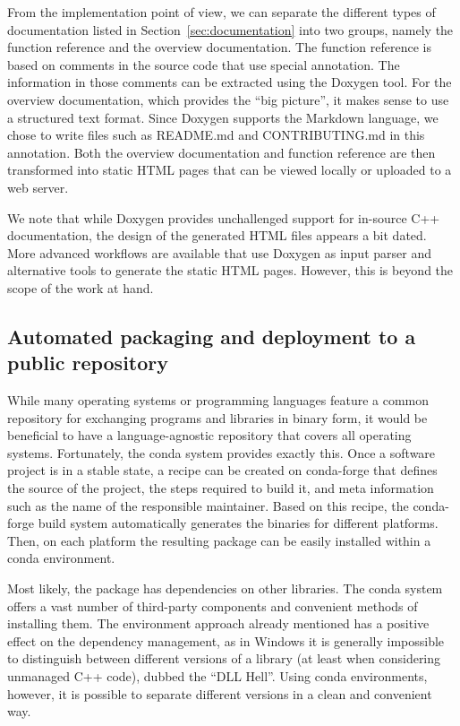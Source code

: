 \documentclass[@CLASSOPTIONS@]{tumarticle}
\begin{document}
From the implementation point of view, we can separate the different types of
documentation listed in Section~\ref{sec:documentation} into two groups,
namely the function reference and the overview documentation. The function
reference is based on comments in the source code that use special annotation.
The information in those comments can be extracted using the Doxygen tool.
For the overview documentation, which provides the ``big picture'', it makes
sense to use a structured text format. Since Doxygen supports the Markdown
language, we chose to write files such as README.md and CONTRIBUTING.md in
this annotation. Both the overview documentation and function reference are
then transformed into static HTML pages that can be viewed locally or
uploaded to a web server.

We note that while Doxygen provides unchallenged support for in-source C++
documentation, the design of the generated HTML files appears a bit dated.
More advanced workflows are available that use Doxygen as input parser and
alternative tools to generate the static HTML pages. However, this is beyond
the scope of the work at hand.

\subsection{Automated packaging and deployment to a public repository}

While many operating systems or programming languages feature a common
repository for exchanging programs and libraries in binary form, it would be
beneficial to have a language-agnostic repository that covers all operating
systems. Fortunately, the conda system provides exactly this. Once a software
project is in a stable state, a recipe can be created on conda-forge that
defines the source of the project, the steps required to build it, and meta
information such as the name of the responsible maintainer. Based on this
recipe, the conda-forge build system automatically generates the binaries for
different platforms. Then, on each platform the resulting package can be
easily installed within a conda environment.

Most likely, the package has dependencies on other libraries. The conda
system offers a vast number of third-party components and convenient methods
of installing them. The environment approach already mentioned has a positive
effect on the dependency management, as in Windows it is generally impossible
to distinguish between different versions of a library (at least when
considering unmanaged C++ code), dubbed the ``DLL Hell''. Using conda
environments, however, it is possible to separate different versions in a
clean and convenient way.
\end{document}
